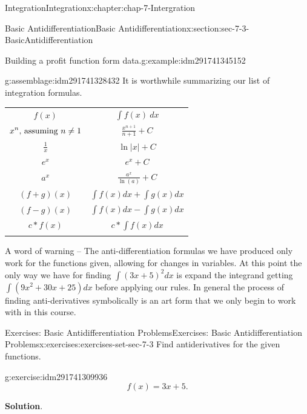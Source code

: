 \documentclass[oneside,10pt,]{book}
\newcommand{\tabularfont}{\relax}
\numberwithin{equation}{section}
\newcommand{\hrulethin}  {\noalign{\hrule height 0.04em}}
\newcommand{\hrulemedium}{\noalign{\hrule height 0.07em}}
\newcommand{\hrulethick} {\noalign{\hrule height 0.11em}}
\begin{document}
\begin{chapterptx}{Integration}{}{Integration}{}{}{x:chapter:chap-7-Intergration}
\begin{sectionptx}{Basic Antidifferentiation}{}{Basic Antidifferentiation}{}{}{x:section:sec-7-3-BasicAntidifferentiation}
\begin{example}{Building a profit function form data.}{g:example:idm291741345152}
\end{example}
\begin{assemblage}{}{g:assemblage:idm291741328432}%
It is worthwhile summarizing our list of integration formulas.%
\begin{sidebyside}{1}{0}{0}{0}%
\begin{sbspanel}{1}%
{\centering%
{\tabularfont%
\begin{tabular}{cc}\hrulethick
\(f(x)\)&\(\int f(x)\ dx\)\tabularnewline\hrulethin
\(\displaystyle x^n\hbox{, assuming }n\ne 1\)&\(\displaystyle \frac{x^{n+1}}{n+1}+C\)\tabularnewline\hrulemedium
\(\displaystyle \frac{1}{x}\)&\(\displaystyle \ln|x|+C\)\tabularnewline\hrulemedium
\(\displaystyle e^x\)&\(\displaystyle e^x+C\)\tabularnewline\hrulemedium
\(\displaystyle a^x\)&\(\displaystyle \frac{a^x}{\ln(a)}+C\)\tabularnewline\hrulemedium
\(\displaystyle (f+g)(x)\)&\(\displaystyle \int f(x)dx+\int g(x)dx\)\tabularnewline\hrulemedium
\(\displaystyle (f-g)(x)\)&\(\displaystyle \int f(x)dx-\int g(x)dx\)\tabularnewline\hrulemedium
\(\displaystyle c*f(x)\)&\(\displaystyle c*\int f(x)dx\)\tabularnewline\hrulemedium
\end{tabular}
}%
\par}
\end{sbspanel}%
\end{sidebyside}%
\end{assemblage}
A word of warning – The anti-differentiation formulas we have produced only work for the functions given, allowing for changes in variables.  At this point the only way we have for finding  \(\int(3x+5)^2 dx\) is expand the integrand getting  \(\int(9x^2+30x+25)dx\) before applying our rules.  In general the process of finding anti-derivatives symbolically is an art form that we only begin to work with in this course.%
%
%
\typeout{************************************************}
\typeout{************************************************}
%
\begin{exercises-subsection}{Exercises: Basic Antidifferentiation Problems}{}{Exercises: Basic Antidifferentiation Problems}{}{}{x:exercises:exercises-set-sec-7-3}
Find antiderivatives for the given functions.%
\begin{divisionexercise}{1}{}{}{g:exercise:idm291741309936}%
%
\begin{equation*}
f(x)=3x+5.
\end{equation*}
\par\smallskip%
\noindent\textbf{Solution}.\hypertarget{g:solution:idm291741309408}{}\quad{}%

\end{divisionexercise}
\end{exercises-subsection}
\end{sectionptx}
\end{chapterptx}
\end{document}

